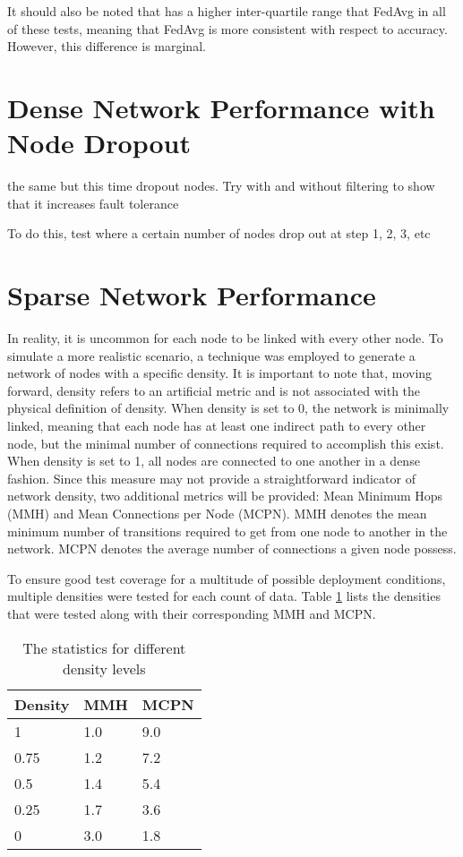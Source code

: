 It should also be noted that \SL has a higher inter-quartile range that FedAvg in all of these tests, meaning that FedAvg is more consistent with respect to accuracy. However, this difference is marginal.


\section{Dense Network Performance with Node Dropout}


the same but this time dropout nodes. Try with and without filtering to show that it increases fault tolerance

To do this, test where a certain number of nodes drop out at step 1, 2, 3, etc

\section{Sparse Network Performance}
In reality, it is uncommon for each node to be linked with every other node. To simulate a more realistic scenario, a technique was employed to generate a network of nodes with a specific density. It is important to note that, moving forward, density refers to an artificial metric and is not associated with the physical definition of density. When density is set to 0, the network is minimally linked, meaning that each node has at least one indirect path to every other node, but the minimal number of connections required to accomplish this exist. When density is set to 1, all nodes are connected to one another in a dense fashion. Since this measure may not provide a straightforward indicator of network density, two additional metrics will be provided:  Mean Minimum Hops (MMH) and Mean Connections per Node (MCPN). MMH denotes the mean minimum number of transitions required to get from one node to another in the network. MCPN denotes the average number of connections a given node possess.

To ensure good test coverage for a multitude of possible deployment conditions, multiple densities were tested for each count of data. Table \ref{sparsedensities} lists the densities that were tested along with their corresponding MMH and MCPN.

\begin{table}[H]
	\centering
	\begin{tabular}{l|l|l}
		Density & MMH & MCPN \\ \hline
		1 & 1.0 & 9.0 \\
		0.75    & 1.2 & 7.2  \\
		0.5    & 1.4 & 5.4  \\
		0.25    & 1.7 & 3.6  \\
		0    & 3.0 & 1.8  \\
	\end{tabular}
	\caption{The statistics for different density levels} \label{sparsedensities}
\end{table}

